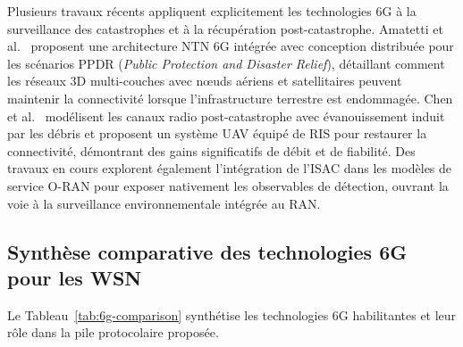Plusieurs travaux récents appliquent explicitement les technologies 6G à la surveillance des catastrophes et à la récupération post-catastrophe. Amatetti et al.\ \cite{amatetti2024ntn} proposent une architecture NTN 6G intégrée avec conception distribuée pour les scénarios PPDR (\emph{Public Protection and Disaster Relief}), détaillant comment les réseaux 3D multi-couches avec n\oe{}uds aériens et satellitaires peuvent maintenir la connectivité lorsque l'infrastructure terrestre est endommagée. Chen et al.\ \cite{chen2024ris_uav} modélisent les canaux radio post-catastrophe avec évanouissement induit par les débris et proposent un système UAV équipé de RIS pour restaurer la connectivité, démontrant des gains significatifs de débit et de fiabilité. Des travaux en cours explorent également l'intégration de l'ISAC dans les modèles de service O-RAN pour exposer nativement les observables de détection, ouvrant la voie à la surveillance environnementale intégrée au RAN.

\subsection{Synthèse comparative des technologies 6G pour les WSN}

Le Tableau~\ref{tab:6g-comparison} synthétise les technologies 6G habilitantes et leur rôle dans la pile protocolaire proposée.

\begin{table}[htbp]
\centering
\caption{Technologies habilitantes 6G et leur apport aux WSN de surveillance des catastrophes.}
\label{tab:6g-comparison}
\end{table}

